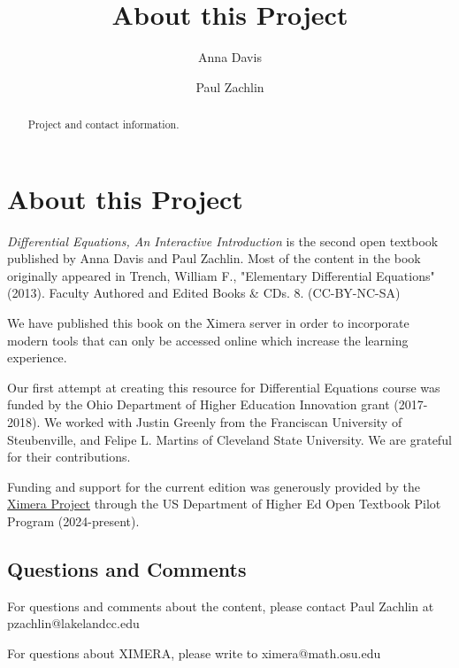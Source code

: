 \documentclass{ximera}
\author{Anna Davis \and Paul Zachlin}
\title{About this Project} \license{CC-BY 4.0}
\begin{document}
\begin{abstract}
 Project and contact information.
\end{abstract}
\maketitle

\section{About this Project}
\emph{Differential Equations, An Interactive Introduction} is the second open textbook published by Anna Davis and Paul Zachlin.  Most of the content in the book originally appeared in Trench, William F., "Elementary Differential Equations" (2013). Faculty Authored and Edited Books \& CDs. 8. (CC-BY-NC-SA)

We have published this book on the Ximera server in order to incorporate modern tools that can only be accessed online which increase the learning experience.

Our first attempt at creating this resource for Differential Equations course was funded by the Ohio Department of Higher Education Innovation grant (2017-2018).  We worked with Justin Greenly from the Franciscan University of Steubenville, and Felipe L. Martins of Cleveland State University.  We are grateful for their contributions.

Funding and support for the current edition was generously provided by the \href{https://github.com/XimeraProject}{Ximera Project} through the US Department of Higher Ed Open Textbook Pilot Program (2024-present).

\subsection{Questions and Comments}
For questions and comments about the content, please contact Paul Zachlin at pzachlin@lakelandcc.edu

For questions about XIMERA, please write to ximera@math.osu.edu

\end{document}
